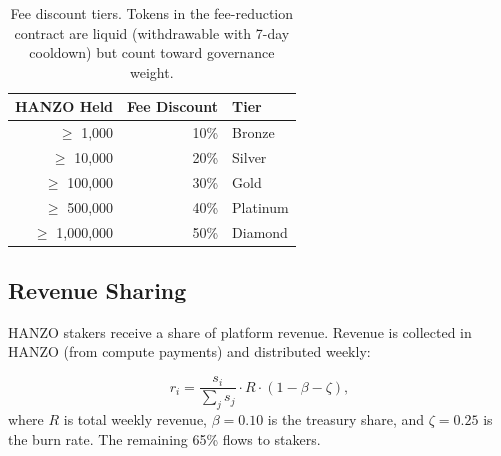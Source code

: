 \begin{table}[H]
\centering
\small
\begin{tabular}{rrl}
\toprule
\textbf{HANZO Held} & \textbf{Fee Discount} & \textbf{Tier} \\
\midrule
$\geq$ 1,000 & 10\% & Bronze \\
$\geq$ 10,000 & 20\% & Silver \\
$\geq$ 100,000 & 30\% & Gold \\
$\geq$ 500,000 & 40\% & Platinum \\
$\geq$ 1,000,000 & 50\% & Diamond \\
\bottomrule
\end{tabular}
\caption{Fee discount tiers. Tokens in the fee-reduction contract are liquid (withdrawable with 7-day cooldown) but count toward governance weight.}
\label{tab:fees}
\end{table}

\subsection{Revenue Sharing}
\label{sec:revshare}

HANZO stakers receive a share of platform revenue. Revenue is collected in HANZO
(from compute payments) and distributed weekly:

\begin{equation}
r_i = \frac{s_i}{\sum_j s_j} \cdot R \cdot (1 - \beta - \zeta),
\end{equation}
where $R$ is total weekly revenue, $\beta = 0.10$ is the treasury share, and
$\zeta = 0.25$ is the burn rate. The remaining 65\% flows to stakers.

